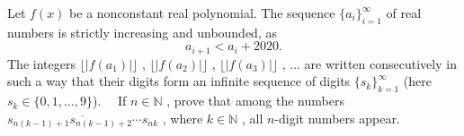 Let $f(x)$ be a nonconstant real polynomial. The sequence $\{a_i\}_{i=1}^{\infty}$ of real numbers is strictly increasing and unbounded, as
$$a_{i+1}<a_i+2020.$$The integers $\lfloor{|f(a_1)|}\rfloor$ , $\lfloor{|f(a_2)|}\rfloor$ , $\lfloor{|f(a_3)|}\rfloor$ , $\dots$ are written consecutively in such a way that their digits form an infinite sequence of digits $\{s_k\}_{k=1}^{\infty}$ (here $s_k\in\{0, 1, \dots, 9\}$).
$\quad$If $n\in\mathbb{N}$ , prove that among the numbers $\overline{s_{n(k-1)+1}s_{n(k-1)+2}\cdots s_{nk}}$ , where $k\in\mathbb{N}$ , all $n$-digit numbers appear.